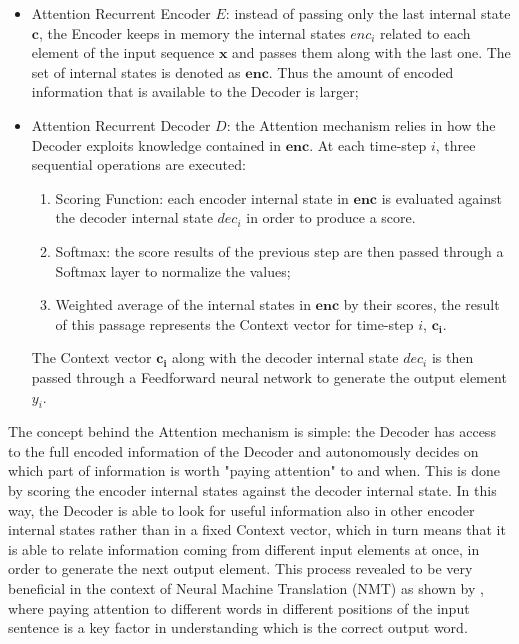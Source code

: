                 \begin{itemize}[topsep=0.5em, partopsep=0.5em]
                    \setlength\itemsep{0em}
                    \item Attention Recurrent Encoder $E$: instead of passing only the last internal state $\mathbf{c}$, the Encoder keeps in memory the internal states $enc_i$ related to each element of the input sequence $\mathbf{x}$ and passes them along with the last one. The set of internal states is denoted as $\mathbf{enc}$. Thus the amount of encoded information that is available to the Decoder is larger;
                    \item Attention Recurrent Decoder $D$: the Attention mechanism relies in how the Decoder exploits knowledge contained in $\mathbf{enc}$. At each time-step $i$, three sequential operations are executed:
                    \begin{enumerate}[topsep=0.5em, partopsep=0.5em]
                        \setlength\itemsep{0em}
                        \item Scoring Function: each encoder internal state in $\mathbf{enc}$ is evaluated against the decoder internal state $dec_i$ in order to produce a score.
                        \item Softmax: the score results of the previous step are then passed through a Softmax layer to normalize the values;
                        \item Weighted average of the internal states in $\mathbf{enc}$ by their scores, the result of this passage represents the Context vector for time-step $i$, $\mathbf{c_i}$.
                    \end{enumerate}
                    The Context vector $\mathbf{c_i}$ along with the decoder internal state $dec_i$ is then passed through a Feedforward neural network to generate the output element $y_i$. 
                \end{itemize}
                \noindent
                The concept behind the Attention mechanism is simple: the Decoder has access to the full encoded information of the Decoder and autonomously decides on which part of information is worth "paying attention" to and when. This is done by scoring the encoder internal states against the decoder internal state. In this way, the Decoder is able to look for useful information also in other encoder internal states rather than in a fixed Context vector, which in turn means that it is able to relate information coming from different input elements at once, in order to generate the next output element. \newline
                This process revealed to be very beneficial in the context of Neural Machine Translation (NMT) as shown by , where paying attention to different words in different positions of the input sentence is a key factor in understanding which is the correct output word.
        
